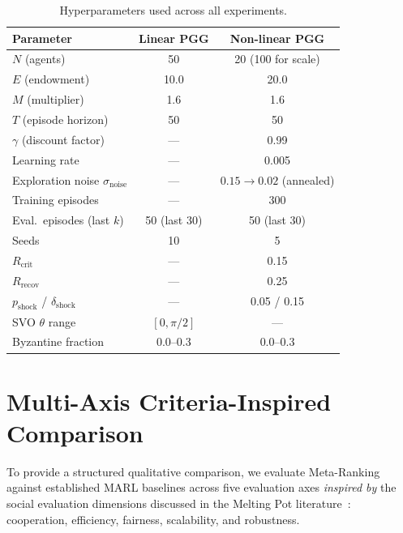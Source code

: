 \documentclass{article}
\begin{document}
\begin{table}[h]
\centering
\caption{Hyperparameters used across all experiments.}
\label{tab:hyperparams}
\begin{tabular}{lcc}
\toprule
\textbf{Parameter} & \textbf{Linear PGG} & \textbf{Non-linear PGG} \\
\midrule
$N$ (agents) & 50 & 20 (100 for scale) \\
$E$ (endowment) & 10.0 & 20.0 \\
$M$ (multiplier) & 1.6 & 1.6 \\
$T$ (episode horizon) & 50 & 50 \\
$\gamma$ (discount factor) & --- & 0.99 \\
Learning rate & --- & 0.005 \\
Exploration noise $\sigma_{\text{noise}}$ & --- & $0.15 \to 0.02$ (annealed) \\
Training episodes & --- & 300 \\
Eval.\ episodes (last $k$) & 50 (last 30) & 50 (last 30) \\
Seeds & 10 & 5 \\
$R_{\text{crit}}$ & --- & 0.15 \\
$R_{\text{recov}}$ & --- & 0.25 \\
$p_{\text{shock}}$ / $\delta_{\text{shock}}$ & --- & 0.05 / 0.15 \\
SVO $\theta$ range & $[0, \pi/2]$ & --- \\
Byzantine fraction & 0.0--0.3 & 0.0--0.3 \\
\bottomrule
\end{tabular}
\end{table}

\section{Multi-Axis Criteria-Inspired Comparison}
\label{app:melting_pot}

To provide a structured qualitative comparison, we evaluate Meta-Ranking against established MARL baselines across five evaluation axes \emph{inspired by} the social evaluation dimensions discussed in the Melting Pot literature~\citep{leibo2021scalable}: cooperation, efficiency, fairness, scalability, and robustness.
\end{document}
